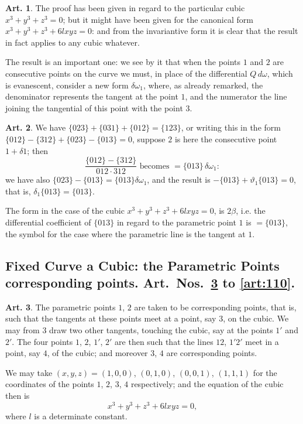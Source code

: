 \documentclass[12pt,a4paper]{article}
\theoremstyle{definition}
\newtheorem{art}{Art.}[section]
\begin{document}
\begin{art}\label{art:105}
The proof has been given in regard to the particular cubic $x^3 + y^3 + z^3 = 0$; but it might have been given for the canonical form $x^3 + y^3 + z^3 + 6lxyz = 0$: and from the invariantive form it is clear that the result in fact applies to any cubic whatever.

The result is an important one: we see by it that when the points $1$ and $2$ are consecutive points on the curve we must, in place of the differential $Q\,d\omega$, which is evanescent, consider a new form $\delta\omega_1$, where, as already remarked, the denominator represents the tangent at the point $1$, and the numerator the line joining the tangential of this point with the point $3$.
\end{art}

\begin{art}\label{art:106}
We have $\{023\} + \{031\} + \{012\} = \{123\}$, or writing this in the form $\{012\} - \{312\} + \{023\} - \{013\} = 0$, suppose $2$ is here the consecutive point $1 + \delta 1$; then
\[
\frac{\{012\} - \{312\}}{012 \cdot 312} \text{ becomes } = \{013\}\,\delta\omega_1:
\]
we have also $\{023\} - \{013\} = \{013\}\delta\omega_1$, and the result is $-\{013\} + \vartheta_1\{013\} = 0$, that is, $\delta_1\{013\} = \{013\}$.

The form in the case of the cubic $x^3 + y^3 + z^3 + 6lxyz = 0$, is $2\beta$, i.e. the differential coefficient of $\{013\}$ in regard to the parametric point $1$ is $= \{013\}$, the symbol for the case where the parametric line is the tangent at $1$.
\end{art}

\newpage
\subsection*{Fixed Curve a Cubic: the Parametric Points corresponding points. Art.~Nos.~\ref{art:107} to \ref{art:110}.}

\begin{art}\label{art:107}
The parametric points $1$, $2$ are taken to be corresponding points, that is, such that the tangents at these points meet at a point, say $3$, on the cubic. We may from $3$ draw two other tangents, touching the cubic, say at the points $1'$ and $2'$. The four points $1$, $2$, $1'$, $2'$ are then such that the lines $12$, $1'2'$ meet in a point, say $4$, of the cubic; and moreover $3$, $4$ are corresponding points.

We may take $(x, y, z) = (1, 0, 0)$, $(0, 1, 0)$, $(0, 0, 1)$, $(1, 1, 1)$ for the coordinates of the points $1$, $2$, $3$, $4$ respectively; and the equation of the cubic then is
\[
x^3 + y^3 + z^3 + 6lxyz = 0,
\]
where $l$ is a determinate constant.
\end{art}
\end{document}
